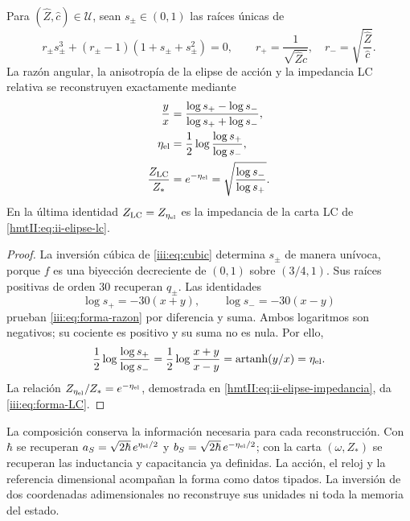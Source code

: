 \begin{proposition}
\label{iii:prop:forma-LC}
Para $(\widehat Z,\widehat c)\in\mathcal U$, sean $s_\pm\in(0,1)$ las
raíces únicas de
\begin{equation}
 r_\pm s_\pm^3+(r_\pm-1)(1+s_\pm+s_\pm^2)=0,
 \qquad
 r_+=\frac1{\sqrt{\widehat Z\widehat c}},\quad
 r_-=\sqrt{\frac{\widehat Z}{\widehat c}}.
 \label{iii:eq:forma-inversion}
\end{equation}
La razón angular, la anisotropía de la elipse de acción y la impedancia
LC relativa se reconstruyen exactamente mediante
\begin{align}
 \frac{y}{x}
 &=\frac{\log s_+-\log s_-}{\log s_++\log s_-},
 \label{iii:eq:forma-razon}\\
 \eta_{\rm el}
 &=\frac12\log\frac{\log s_+}{\log s_-},
 \label{iii:eq:forma-eta}\\
 \frac{Z_{\rm LC}}{Z_*}
 &=e^{-\eta_{\rm el}}
  =\sqrt{\frac{\log s_-}{\log s_+}}.
 \label{iii:eq:forma-LC}
\end{align}
En la última identidad $Z_{\rm LC}=Z_{\eta_{\rm el}}$ es la impedancia
de la carta LC de \eqref{hmtII:eq:ii-elipse-lc}.
\end{proposition}
\begin{proof}
La inversión cúbica de \eqref{iii:eq:cubic} determina $s_\pm$ de manera
unívoca, porque $f$ es una biyección decreciente de $(0,1)$ sobre
$(3/4,1)$. Sus raíces positivas de orden $30$ recuperan $q_\pm$.
Las identidades
\[
 \log s_+=-30(x+y),\qquad \log s_-=-30(x-y)
\]
prueban \eqref{iii:eq:forma-razon} por diferencia y suma. Ambos logaritmos
son negativos; su cociente es positivo y su suma no es nula. Por ello,
\[
 \frac12\log\frac{\log s_+}{\log s_-}
   =\frac12\log\frac{x+y}{x-y}
   =\operatorname{artanh}(y/x)=\eta_{\rm el}.
\]
La relación $Z_{\eta_{\rm el}}/Z_*=e^{-\eta_{\rm el}}$, demostrada en
\eqref{hmtII:eq:ii-elipse-impedancia}, da \eqref{iii:eq:forma-LC}.
\end{proof}

La composición conserva la información necesaria para cada reconstrucción.
Con $\hbar$ se recuperan
$a_S=\sqrt{2\hbar}\,e^{\eta_{\rm el}/2}$ y
$b_S=\sqrt{2\hbar}\,e^{-\eta_{\rm el}/2}$; con la carta
$(\omega,Z_*)$ se recuperan las inductancia y capacitancia ya definidas.
La acción, el reloj y la referencia dimensional acompañan la forma como
datos tipados. La inversión de dos coordenadas adimensionales no
reconstruye sus unidades ni toda la memoria del estado.


